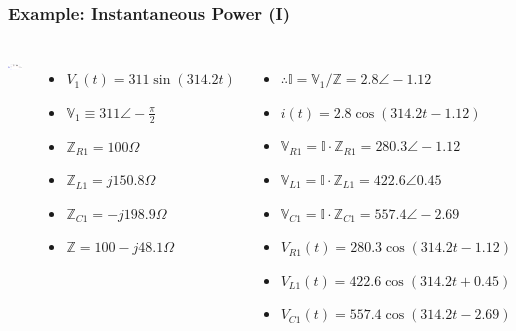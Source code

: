 \documentclass{beamer}
\begin{document}
\begin{frame}[fragile]
\frametitle{Example: Instantaneous Power (I)}

\vspace{-1cm}

\begin{columns}[c]

\begin{center}
\includegraphics[width=\textwidth]{src/Fig06a.png}
\end{center}
%
\vspace{-0.5cm}
%
\begin{itemize}
\item $V_1(t) = 311 \sin(314.2 t)$
\item $\mathbb{V}_1 \equiv 311 \angle -\frac{\pi}{2}$
\item $\mathbb{Z}_{R1} = 100 \Omega$ 
\item $\mathbb{Z}_{L1} = j150.8 \Omega$
\item $\mathbb{Z}_{C1} = -j198.9 \Omega$
\item $\mathbb{Z} = 100 -j48.1 \Omega$ 
\end{itemize}


\begin{itemize}
\item $\therefore \mathbb{I} = \mathbb{V}_1/\mathbb{Z} = 2.8 \angle -1.12$
\item $i(t) = 2.8 \cos(314.2 t - 1.12)$
\item $\mathbb{V}_{R1} = \mathbb{I} \cdot \mathbb{Z}_{R1} = 280.3 \angle -1.12$
\item $\mathbb{V}_{L1} = \mathbb{I} \cdot \mathbb{Z}_{L1} = 422.6 \angle 0.45$
\item $\mathbb{V}_{C1} = \mathbb{I} \cdot \mathbb{Z}_{C1} = 557.4 \angle -2.69$
\item $V_{R1}(t) = 280.3 \cos(314.2 t - 1.12)$
\item $V_{L1}(t) = 422.6 \cos(314.2 t + 0.45)$
\item $V_{C1}(t) = 557.4 \cos(314.2 t - 2.69)$
\end{itemize}


\end{columns}
\end{frame}
\end{document}
